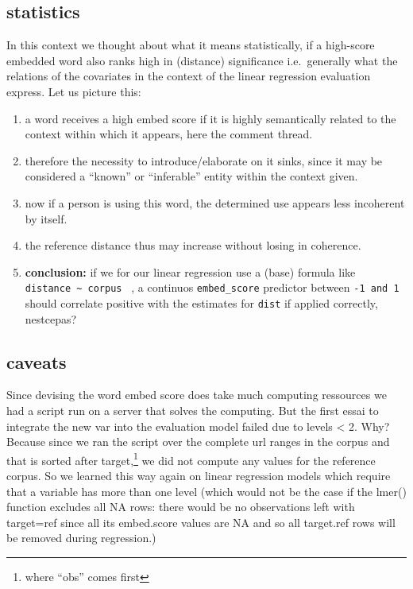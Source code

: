 \documentclass[12pt,a4paper]{article}
\begin{document}
\subsection{statistics}\label{statistics}

In this context we thought about what it means statistically, if a high-score embedded word also ranks high in (distance) significance i.e.~generally what the relations of the covariates in the context of the linear regression evaluation express. Let us picture this:

\begin{enumerate}
\def\labelenumi{\arabic{enumi}.}
\tightlist
\item
  a word receives a high embed score if it is highly semantically related to the context within which it appears, here the comment thread.
\item
  therefore the necessity to introduce/elaborate on it sinks, since it may be considered a ``known'' or ``inferable'' entity within the context given.
\item
  now if a person is using this word, the determined use appears less incoherent by itself.
\item
  the reference distance thus may increase without losing in coherence.
\item
  \textbf{conclusion:} if we for our linear regression use a (base) formula like \texttt{distance\ \textasciitilde{}\ corpus~} , a continuos \texttt{embed\_score} predictor between \texttt{-1\ and\ 1} should correlate positive with the estimates for \texttt{dist} if applied correctly, nestcepas?
\end{enumerate}

\subsection{caveats}\label{caveats}

Since devising the word embed score does take much computing ressources we had a script run on a server that solves the computing. But the first essai to integrate the new var into the evaluation model failed due to levels \textless{} 2. Why? Because since we ran the script over the complete url ranges in the corpus and that is sorted after target,\footnote{where ``obs'' comes first} we did not compute any values for the reference corpus. So we learned this way again on linear regression models which require that a variable has more than one level (which would not be the case if the lmer() function excludes all NA rows: there would be no observations left with target=ref since all its embed.score values are NA and so all target.ref rows will be removed during regression.)
\end{document}
